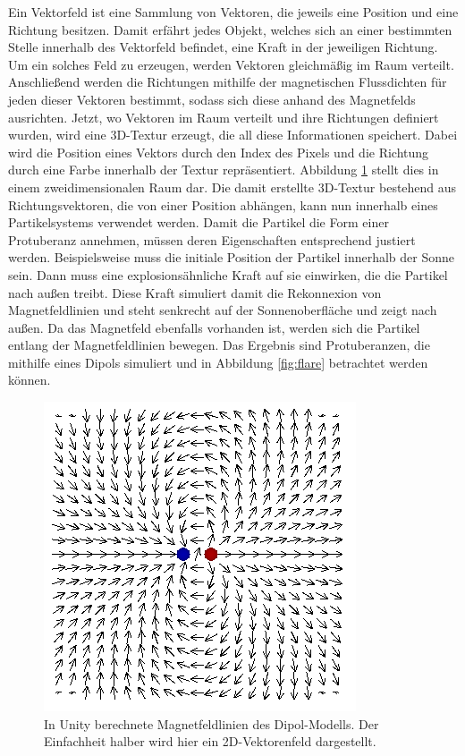 Ein Vektorfeld ist eine Sammlung von Vektoren, die jeweils eine Position
und eine Richtung besitzen. Damit erfährt jedes Objekt, welches sich an einer
bestimmten Stelle innerhalb des Vektorfeld befindet, eine Kraft in der
jeweiligen Richtung. Um ein solches Feld zu erzeugen,
werden Vektoren gleichmäßig im Raum verteilt. Anschließend werden die Richtungen
mithilfe der magnetischen Flussdichten für jeden dieser Vektoren bestimmt, sodass
sich diese anhand des Magnetfelds ausrichten. Jetzt, wo Vektoren im Raum
verteilt und ihre Richtungen definiert wurden, wird eine 3D-Textur erzeugt, die
all diese Informationen speichert. Dabei wird die Position eines Vektors durch
den Index des Pixels und die Richtung durch eine Farbe innerhalb der Textur
repräsentiert. Abbildung \ref{fig:dipole-vector-field-unity} stellt dies in einem
zweidimensionalen Raum dar. Die damit erstellte 3D-Textur bestehend aus
Richtungsvektoren, die von einer Position abhängen, kann nun innerhalb eines
Partikelsystems verwendet werden. Damit die Partikel die Form einer Protuberanz
annehmen, müssen deren Eigenschaften entsprechend justiert werden. Beispielsweise
muss die initiale Position der Partikel innerhalb der Sonne sein. Dann muss eine
explosionsähnliche Kraft auf sie einwirken, die die Partikel nach außen treibt.
Diese Kraft simuliert damit die Rekonnexion von Magnetfeldlinien und steht senkrecht
auf der Sonnenoberfläche und zeigt nach außen. Da das Magnetfeld ebenfalls vorhanden
ist, werden sich die Partikel entlang der Magnetfeldlinien bewegen. Das Ergebnis
sind Protuberanzen, die mithilfe eines Dipols simuliert und in Abbildung \ref{fig:flare}
betrachtet werden können.

\begin{figure}
  \includegraphics[width=0.75\columnwidth]{dipole-vector-field-unity}
  \caption{In Unity berechnete Magnetfeldlinien des Dipol-Modells. Der Einfachheit halber wird hier ein 2D-Vektorenfeld dargestellt.}
  \label{fig:dipole-vector-field-unity}
\end{figure}

